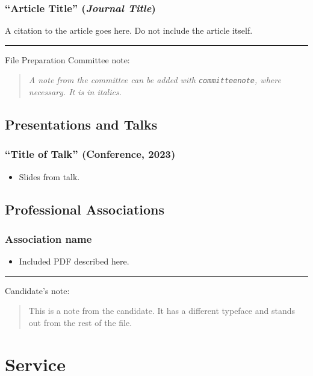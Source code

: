 \documentclass[12pt,oneside]{book}
\newcommand{\candidatenote}[1] {%
\par\noindent\rule{\textwidth}{1pt}
{\large Candidate's note:}
\begin{quote}
  \fontfamily{phv}\selectfont
  {\small #1}
\end{quote}
}
\newcommand{\committeenote}[1] {%
\par\noindent\rule{\textwidth}{1pt}
{\large File Preparation Committee note:}
\begin{quote}
  \itshape{}
  {\small #1}
\end{quote}
}
\begin{document}
\subsection{``Article Title'' (\textit{Journal Title})}

A citation to the article goes here.  Do not include the article itself.

\vspace{\baselineskip}

\committeenote{A note from the committee can be added with {\tt committeenote}, where necessary.  It is in italics.}

\newpage

\section{Presentations and Talks}

\subsection{``Title of Talk'' (Conference, 2023)}

\begin{itemize}
  \item Slides from talk.
\end{itemize}


\section{Professional Associations}

\subsection{Association name}

\begin{itemize}
  \item Included PDF described here.
\end{itemize}

\candidatenote{
  This is a note from the candidate.  It has a different typeface and stands out from the rest of the file.
}



\renewcommand\thechapter{C}
\chapter{Service}
\end{document}
